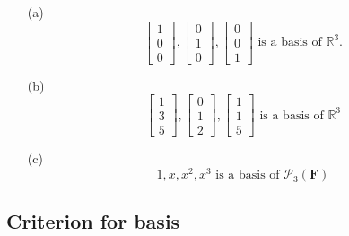 \documentclass[11pt]{article}
\begin{document}
    \begin{enumerate}
        \item[(a)] \begin{equation*}
                        \begin{bmatrix}
                            1 \\ 0 \\ 0
                        \end{bmatrix}, \begin{bmatrix}
                                            0 \\ 1 \\ 0
                                        \end{bmatrix}, \begin{bmatrix}
                                                            0 \\ 0 \\ 1
                                                        \end{bmatrix} \text{ is a basis of } \mathbb{R}^3.
                   \end{equation*} 
        \item[(b)] \begin{equation*}
            \begin{bmatrix}
                1 \\ 3 \\ 5
            \end{bmatrix}, \begin{bmatrix}
                                0 \\ 1 \\ 2
                            \end{bmatrix}, \begin{bmatrix}
                                                1 \\ 1 \\ 5
                                            \end{bmatrix} \text{ is a basis of } \mathbb{R}^3
        \end{equation*}
        \item[(c)] \[ 1, x, x^2, x^3 \text{ is a basis of } \mathcal{P}_3(\textbf{F}) \]
    \end{enumerate}

    \subsection{Criterion for basis}
\end{document}
